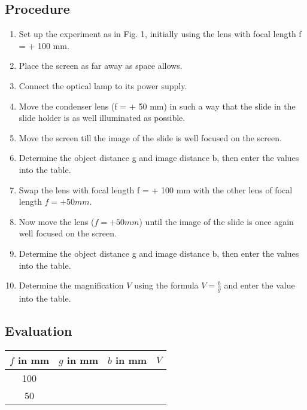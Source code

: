 \documentclass[12pt]{article}
\begin{document}
\subsection*{Procedure}

\begin{enumerate}
    \item Set up the experiment as in Fig. 1, initially using the lens with focal length f = + 100 mm.
    \item Place the screen as far away as space allows.
    \item Connect the optical lamp to its power supply.
    \item Move the condenser lens (f = + 50 mm) in such a way that the slide in the slide holder is as well illuminated as possible.
    \item Move the screen till the image of the slide is well focused on the screen.
    \item Determine the object distance g and image distance b, then enter the values into the table.
    \item Swap the lens with focal length f = + 100 mm with the other lens of focal length $f = + 50 mm$.
    \item Now move the lens ($f = + 50 mm$) until the image of the slide is once again well focused on the screen.
    \item Determine the object distance g and image distance b, then enter the values into the table.
    \item Determine the magnification $V$ using the formula $V=\frac{b}{g}$ and enter the value into the table. 
\end{enumerate}

\subsection*{Evaluation}
\begin{tabular}{|c|c|c|c|}
    \hline
    $f$ in mm & $g$ in mm & $b$ in mm & $V$  \\
    \hline
    100 & & & \\
    \hline
    50 & & & \\
    \hline
\end{tabular}
\end{document}
